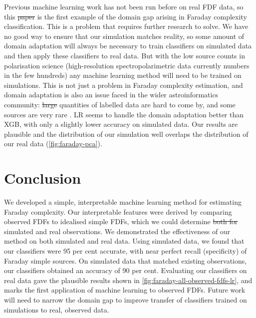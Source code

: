 \documentclass[11pt, a4paper]{book}
\providecommand{\DIFaddtex}[1]{{\protect\color{blue}\uwave{#1}}} %
\providecommand{\DIFdeltex}[1]{{\protect\color{red}\sout{#1}}}                      %
\providecommand{\DIFaddbegin}{} %
\providecommand{\DIFaddend}{} %
\providecommand{\DIFdelbegin}{} %
\providecommand{\DIFdelend}{} %
\providecommand{\DIFadd}[1]{\texorpdfstring{\DIFaddtex{#1}}{#1}} %
\providecommand{\DIFdel}[1]{\texorpdfstring{\DIFdeltex{#1}}{}} %
\newcommand{\DIFscaledelfig}{0.5}
\newlength{\DIFdelgraphicswidth} %
\newlength{\DIFdelgraphicsheight} %
\newcommand{\DIFaddincludegraphics}[2][]{{\color{blue}\fbox{\DIFOincludegraphics[#1]{#2}}}} %
\newcommand{\DIFdelincludegraphics}[2][]{%
\sbox{\DIFdelgraphicsbox}{\DIFOincludegraphics[#1]{#2}}%
\settoboxwidth{\DIFdelgraphicswidth}{\DIFdelgraphicsbox} %
\settoboxtotalheight{\DIFdelgraphicsheight}{\DIFdelgraphicsbox} %
\scalebox{\DIFscaledelfig}{%
\parbox[b]{\DIFdelgraphicswidth}{\usebox{\DIFdelgraphicsbox}\\[-\baselineskip] \rule{\DIFdelgraphicswidth}{0em}}\llap{\resizebox{\DIFdelgraphicswidth}{\DIFdelgraphicsheight}{%
\setlength{\unitlength}{\DIFdelgraphicswidth}%
\begin{picture}(1,1)%
\thicklines\linethickness{2pt} %
{\color[rgb]{1,0,0}\put(0,0){\framebox(1,1){}}}%
{\color[rgb]{1,0,0}\put(0,0){\line( 1,1){1}}}%
{\color[rgb]{1,0,0}\put(0,1){\line(1,-1){1}}}%
\end{picture}%
}\hspace*{3pt}}} %
} %
\DeclareRobustCommand{\DIFaddbegin}{\DIFOaddbegin \let\includegraphics\DIFaddincludegraphics} %
\DeclareRobustCommand{\DIFaddend}{\DIFOaddend \let\includegraphics\DIFOincludegraphics} %
\DeclareRobustCommand{\DIFdelbegin}{\DIFOdelbegin \let\includegraphics\DIFdelincludegraphics} %
\DeclareRobustCommand{\DIFdelend}{\DIFOaddend \let\includegraphics\DIFOincludegraphics} %
\begin{document}
    Previous machine learning work \citep[e.g.][]{brown_classifying_2018} has not been run before on real FDF data, so this \DIFdelbegin \DIFdel{paper }\DIFdelend \DIFaddbegin \DIFadd{chapter }\DIFaddend is the first example of the domain gap arising in Faraday complexity classification. This is a problem that requires further research to solve. We have no good way to ensure that our simulation matches reality, so some amount of domain adaptation will always be necessary to train classifiers on simulated data and then \DIFaddbegin \DIFadd{to }\DIFaddend apply these classifiers to real data. But with the low source counts in polarisation science (high-resolution spectropolarimetric data currently numbers in the few hundreds) any machine learning method will need to be trained on simulations. This is not just a problem in Faraday complexity estimation, and domain adaptation is also an issue faced in the wider astroinformatics community: \DIFdelbegin \DIFdel{large }\DIFdelend \DIFaddbegin \DIFadd{Large }\DIFaddend quantities of labelled data are hard to come by, and some sources are very rare \citep[e.g. gravitational wave detections or fast radio bursts;][]{zevin17gravityspy, gebhard19convolutional,agarwal_fetch_2020}. LR seems to handle the domain adaptation better than XGB, with only a slightly lower accuracy on simulated data. Our results are plausible and the distribution of our simulation well overlaps the distribution of our real data (\autoref{fig:faraday-pca}).

\section{Conclusion}
\label{sec:faraday-conclusion}

  We developed a simple, interpretable machine learning method for estimating Faraday complexity. Our interpretable features were derived by comparing observed FDFs to idealised simple FDFs, which we could determine \DIFdelbegin \DIFdel{both for }\DIFdelend \DIFaddbegin \DIFadd{for both }\DIFaddend simulated and real observations. We demonstrated the effectiveness of our method on both simulated and real data. Using simulated data, we found that our classifiers were 95 per cent accurate, with near perfect recall (specificity) of Faraday simple sources. On simulated data that matched existing observations, our classifiers obtained an accuracy of 90 per cent. Evaluating our classifiers on real data gave the plausible results shown in \autoref{fig:faraday-all-observed-fdfs-lr}, and marks the first application of machine learning to observed FDFs. Future work will need to narrow the domain gap to improve transfer of classifiers trained on simulations to real, observed data.
\end{document}
